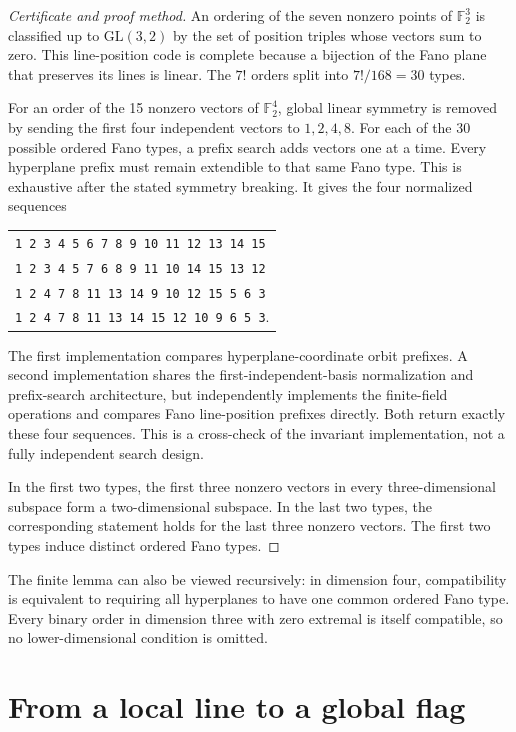 \documentclass[11pt]{article}
\begin{document}
\begin{proof}[Certificate and proof method]
An ordering of the seven nonzero points of $\mathbb F_2^3$ is classified up
to $\mathrm{GL}(3,2)$ by the set of position triples whose vectors sum to
zero. This line-position code is complete because a bijection of the Fano
plane that preserves its lines is linear. The $7!$ orders split into
$7!/168=30$ types.

For an order of the 15 nonzero vectors of $\mathbb F_2^4$, global linear
symmetry is removed by sending the first four independent vectors to
$1,2,4,8$. For each of the 30 possible ordered Fano types, a prefix search
adds vectors one at a time. Every hyperplane prefix must remain extendible to
that same Fano type. This is exhaustive after the stated symmetry breaking.
It gives the four normalized sequences
\begin{center}
\begin{tabular}{l}
\texttt{1 2 3 4 5 6 7 8 9 10 11 12 13 14 15}\\
\texttt{1 2 3 4 5 7 6 8 9 11 10 14 15 13 12}\\
\texttt{1 2 4 7 8 11 13 14 9 10 12 15 5 6 3}\\
\texttt{1 2 4 7 8 11 13 14 15 12 10 9 6 5 3}.
\end{tabular}
\end{center}

The first implementation compares hyperplane-coordinate orbit prefixes. A
second implementation shares the first-independent-basis normalization and
prefix-search architecture, but independently implements the finite-field
operations and compares Fano line-position prefixes directly. Both return
exactly these four sequences. This is a cross-check of the invariant
implementation, not a fully independent search design.

In the first two types, the first three nonzero vectors in every
three-dimensional subspace form a two-dimensional subspace. In the last two
types, the corresponding statement holds for the last three nonzero vectors.
The first two types induce distinct ordered Fano types.
\end{proof}

The finite lemma can also be viewed recursively: in dimension four,
compatibility is equivalent to requiring all hyperplanes to have one common
ordered Fano type. Every binary order in dimension three with zero extremal
is itself compatible, so no lower-dimensional condition is omitted.

\section{From a local line to a global flag}
\end{document}

